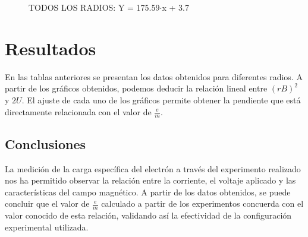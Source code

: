 \documentclass[a4paper,12pt]{report}
\begin{document}
\begin{figure}[b]
\centering
\captionsetup{labelformat=empty} %
\caption*{TODOS LOS RADIOS: Y = 175.59$\cdot$x + 3.7 }
\end{figure}

\vspace{5cm}

\chapter{Resultados}

    En las tablas anteriores se presentan los datos obtenidos para diferentes radios. A partir de los gráficos obtenidos, podemos deducir la relación lineal entre $ (rB)^2 $ y $ 2U $. 
    El ajuste de cada uno de los gráficos permite obtener la pendiente que está directamente relacionada con el valor de $ \frac{e}{m} $.

\section{Conclusiones}

    La medición de la carga específica del electrón a través del experimento realizado nos ha permitido observar la relación entre la corriente, el voltaje aplicado y las características del campo magnético. A partir de los datos obtenidos, se puede concluir que el valor de $ \frac{e}{m} $ calculado a partir de los experimentos concuerda con el valor conocido de esta relación, validando así la efectividad de la configuración experimental utilizada.
\end{document}
